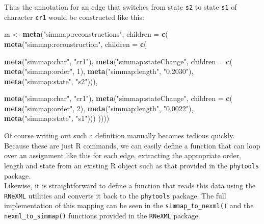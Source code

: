 \documentclass[author-year, review, 11pt]{components/elsarticle} %
\newenvironment{Shaded}{\begin{snugshade}}{\end{snugshade}}
\newcommand{\KeywordTok}[1]{\textcolor[rgb]{0.13,0.29,0.53}{\textbf{{#1}}}}
\newcommand{\DataTypeTok}[1]{\textcolor[rgb]{0.13,0.29,0.53}{{#1}}}
\newcommand{\DecValTok}[1]{\textcolor[rgb]{0.00,0.00,0.81}{{#1}}}
\newcommand{\StringTok}[1]{\textcolor[rgb]{0.31,0.60,0.02}{{#1}}}
\newcommand{\NormalTok}[1]{{#1}}
\begin{document}
Thus the annotation for an edge that switches from state \texttt{s2} to
state \texttt{s1} of character \texttt{cr1} would be constructed like
this:

\begin{Shaded}
\begin{Highlighting}[]
 \NormalTok{m <-}\StringTok{ }\KeywordTok{meta}\NormalTok{(}\StringTok{"simmap:reconstructions"}\NormalTok{, }\DataTypeTok{children =} \KeywordTok{c}\NormalTok{(}
        \KeywordTok{meta}\NormalTok{(}\StringTok{"simmap:reconstruction"}\NormalTok{, }\DataTypeTok{children =} \KeywordTok{c}\NormalTok{(}

          \KeywordTok{meta}\NormalTok{(}\StringTok{"simmap:char"}\NormalTok{, }\StringTok{"cr1"}\NormalTok{),}
          \KeywordTok{meta}\NormalTok{(}\StringTok{"simmap:stateChange"}\NormalTok{, }\DataTypeTok{children =} \KeywordTok{c}\NormalTok{(}
            \KeywordTok{meta}\NormalTok{(}\StringTok{"simmap:order"}\NormalTok{, }\DecValTok{1}\NormalTok{),}
            \KeywordTok{meta}\NormalTok{(}\StringTok{"simmap:length"}\NormalTok{, }\StringTok{"0.2030"}\NormalTok{),}
            \KeywordTok{meta}\NormalTok{(}\StringTok{"simmap:state"}\NormalTok{, }\StringTok{"s2"}\NormalTok{))),}
          
          \KeywordTok{meta}\NormalTok{(}\StringTok{"simmap:char"}\NormalTok{, }\StringTok{"cr1"}\NormalTok{),}
          \KeywordTok{meta}\NormalTok{(}\StringTok{"simmap:stateChange"}\NormalTok{, }\DataTypeTok{children =} \KeywordTok{c}\NormalTok{(}
            \KeywordTok{meta}\NormalTok{(}\StringTok{"simmap:order"}\NormalTok{, }\DecValTok{2}\NormalTok{),}
            \KeywordTok{meta}\NormalTok{(}\StringTok{"simmap:length"}\NormalTok{, }\StringTok{"0.0022"}\NormalTok{),}
            \KeywordTok{meta}\NormalTok{(}\StringTok{"simmap:state"}\NormalTok{, }\StringTok{"s1"}\NormalTok{)))}
          \NormalTok{))))}
\end{Highlighting}
\end{Shaded}

Of course writing out such a definition manually becomes tedious
quickly. Because these are just R commands, we can easily define a
function that can loop over an assignment like this for each edge,
extracting the appropriate order, length and state from an existing R
object such as that provided in the \texttt{phytools}
package.\\Likewise, it is straightforward to define a function that
reads this data using the \texttt{RNeXML} utilities and converts it back
to the \texttt{phytools} package. The full implementation of this
mapping can be seen in the \texttt{simmap\_to\_nexml()} and the
\texttt{nexml\_to\_simmap()} functions provided in the \texttt{RNeXML}
package.
\end{document}
